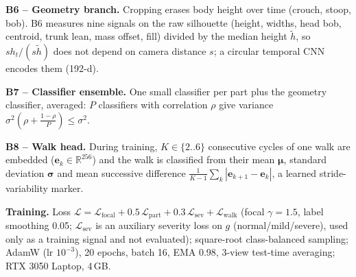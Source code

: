 \documentclass[conference]{IEEEtran}
\newcommand{\R}{\mathbb{R}}
\begin{document}
\textbf{B6 -- Geometry branch.} Cropping erases body height over time
(crouch, stoop, bob). B6 measures nine signals on the raw silhouette (height,
widths, head bob, centroid, trunk lean, mass offset, fill) divided by the
median height $\tilde h$, so $sh_t/(s\tilde h)$ does not depend on camera
distance $s$; a circular temporal CNN encodes them (192-d).

\textbf{B7 -- Classifier ensemble.} One small classifier per part plus the
geometry classifier, averaged: $P$ classifiers with correlation $\rho$ give
variance $\sigma^2(\rho+\frac{1-\rho}{P})\le\sigma^2$.

\textbf{B8 -- Walk head.} During training, $K\in\{2..6\}$ consecutive cycles
of one walk are embedded ($\mathbf e_k\in\R^{256}$) and the walk is classified
from their mean $\boldsymbol\mu$, standard deviation $\boldsymbol\sigma$ and
mean successive difference $\frac1{K-1}\sum_k|\mathbf e_{k+1}-\mathbf e_k|$, a
learned stride-variability marker.

\textbf{Training.} Loss $\mathcal{L}=\mathcal{L}_{\text{focal}}+0.5\,
\mathcal{L}_{\text{part}}+0.3\,\mathcal{L}_{\text{sev}}+\mathcal{L}_{\text{walk}}$
(focal $\gamma=1.5$, label smoothing 0.05; $\mathcal{L}_{\text{sev}}$ is an
auxiliary severity loss on $g$ (normal/mild/severe), used only as a training
signal and not evaluated); square-root class-balanced
sampling; AdamW (lr $10^{-3}$), 20 epochs, batch 16, EMA 0.98, 3-view
test-time averaging; RTX 3050 Laptop, 4\,GB.

\end{document}
